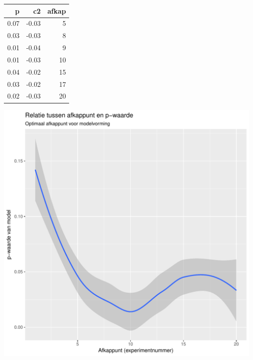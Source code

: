 \documentclass[a0,portrait]{a0poster}
\begin{document}
\begin{multicols}{3}
\begin{tabular}{r r r}
	\hline
	p & c2 & afkap\\
	\hline
	0.07 & -0.03 & 5\\
	0.03 & -0.03 & 8\\
	0.01 & -0.04 & 9\\
	0.01 & -0.03 & 10\\
	0.04 & -0.02 & 15\\
	0.03 & -0.02 & 17\\
	0.02 & -0.03 & 20\\
	\hline
\end{tabular}

\begin{center}\vspace{1cm}
\includegraphics[width=0.8\linewidth]{pwaardes.pdf}
\end{center}\vspace{1cm}


\end{multicols}
\end{document}
